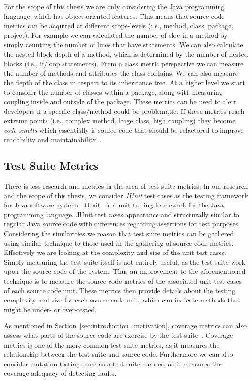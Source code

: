 For the scope of this thesis we are only considering the Java programming language, which has object-oriented features. This means that source code metrics can be acquired at different scope-levels (i.e., method, class, package, project). For example we can calculated the number of \gls{sloc} in a method by simply counting the number of lines that have statements. We can also calculate the nested block depth of a method, which is determined by the number of nested blocks (i.e., if/loop statements). From a class metric perspective we can measure the number of methods and attributes the class contains. We can also measure the depth of the class in respect to its inheritance tree. At a higher level we start to consider the number of classes within a package, along with measuring coupling inside and outside of the package. These metrics can be used to alert developers if a specific class/method could be problematic. If these metrics reach extreme points (i.e., complex method, large class, high coupling) they become \emph{code smells} which essentially is source code that should be refactored to improve readability and maintainability~\cite{FB99}.


\subsection{Test Suite Metrics}
\label{subsec:background_test_suite_metrics}
There is less research and metrics in the area of test suite metrics. In our research and the scope of this thesis, we consider \emph{JUnit} test cases as the testing framework for Java software systems. JUnit~\cite{JUnit} is a unit testing framework for the Java programming language. JUnit test cases appearance and structurally similar to regular Java source code with differences regarding assertions for test purposes. Considering the similarities we reason that test suite metrics can be gathered using similar technique to those used in the gathering of source code metrics. Effectively we are looking at the complexity and size of the unit test cases. Simply measuring the test suite itself is not entirely useful, as the test suite work upon the source code of the system. Thus an improvement to the aforementioned technique is to measure the source code metrics of the associated unit test cases of each source code unit. These metrics then provide details about the testing complexity and size for each source code unit, which can indicate methods that might be under- or over-tested.

As mentioned in Section~\ref{sec:introduction_motivation}, coverage metrics can also assess what parts of the source code are exercise by the test suite~\cite{ZHM97}. Coverage metrics is one of the more common test suite metrics, as it measures the relationship between the test suite and source code. Furthermore we can also consider mutation testing score as a test suite metrics, as it measures the coverage adequacy of detecting faults.



